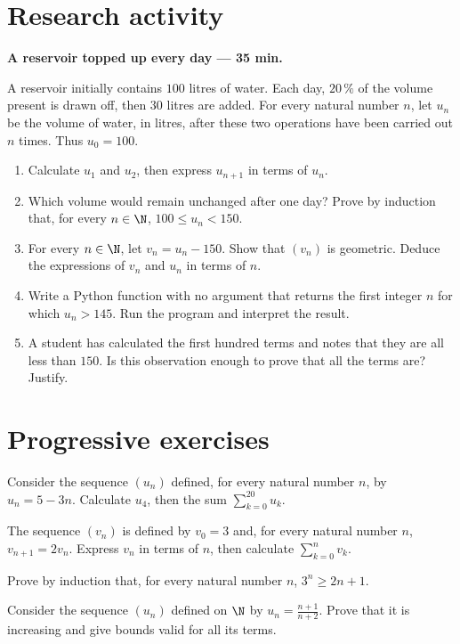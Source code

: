 \section{Research activity}\textbf{A reservoir topped up every day --- 35 min.}\par A reservoir initially contains $100$ litres of water. Each day, $20\,\%$ of the volume present is drawn off, then $30$ litres are added. For every natural number $n$, let $u_n$ be the volume of water, in litres, after these two operations have been carried out $n$ times. Thus $u_0=100$.
\begin{enumerate}\item Calculate $u_1$ and $u_2$, then express $u_{n+1}$ in terms of $u_n$.
\item Which volume would remain unchanged after one day? Prove by induction that, for every $n\in\N$, $100\le u_n<150$.
\item For every $n\in\N$, let $v_n=u_n-150$. Show that $(v_n)$ is geometric. Deduce the expressions of $v_n$ and $u_n$ in terms of $n$.
\item Write a Python function with no argument that returns the first integer $n$ for which $u_n>145$. Run the program and interpret the result.
\item A student has calculated the first hundred terms and notes that they are all less than $150$. Is this observation enough to prove that all the terms are? Justify.\end{enumerate}

\section{Progressive exercises}

Consider the sequence $(u_n)$ defined, for every natural number $n$, by $u_n=5-3n$. Calculate $u_4$, then the sum $\displaystyle\sum_{k=0}^{20}u_k$.

The sequence $(v_n)$ is defined by $v_0=3$ and, for every natural number $n$, $v_{n+1}=2v_n$. Express $v_n$ in terms of $n$, then calculate $\displaystyle\sum_{k=0}^n v_k$.

Prove by induction that, for every natural number $n$, $3^n\ge2n+1$.

Consider the sequence $(u_n)$ defined on $\N$ by $u_n=\frac{n+1}{n+2}$. Prove that it is increasing and give bounds valid for all its terms.

